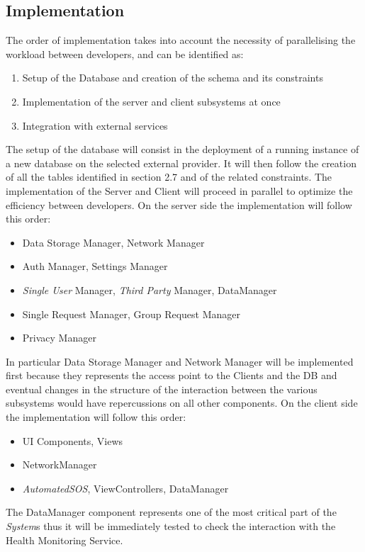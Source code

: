\documentclass[titlepage]{article}
\begin{document}
	\subsection{Implementation}
	The order of implementation takes into account the necessity of parallelising the workload between developers, and can be identified as:
	\begin{enumerate}
		\item Setup of the Database and creation of the schema and its constraints
		\item Implementation of the server and client subsystems at once
		\item Integration with external services
	\end{enumerate}
	The setup of the database will consist in the deployment of a running instance of a new database on the selected external provider. It will then follow the creation of all the tables identified in section 2.7 and of the related constraints. \newline
	\newline
	The implementation of the Server and Client will proceed in parallel to optimize the efficiency between developers.
	\newline
	\newline
	On the server side the implementation will follow this order:
	\begin{itemize}
		\item Data Storage Manager, Network Manager
		\item Auth Manager, Settings Manager
		\item {\it Single User} Manager, {\it Third Party} Manager, DataManager
		\item Single Request Manager, Group Request Manager
		\item Privacy Manager
	\end{itemize}
	In particular Data Storage Manager and Network Manager will be implemented first because they represents the access point to the Clients and the DB and eventual changes in the structure of the interaction between the various subsystems would have repercussions on all other components.
	\newline
	\newline
	On the client side the implementation will follow this order:
	\begin{itemize}
		\item UI Components, Views
		\item NetworkManager
		\item {\it AutomatedSOS}, ViewControllers, DataManager
	\end{itemize}
	The DataManager component represents one of the most critical part of the {\it System}s thus it will be immediately tested to check the interaction with the Health Monitoring Service.
	
\end{document}
